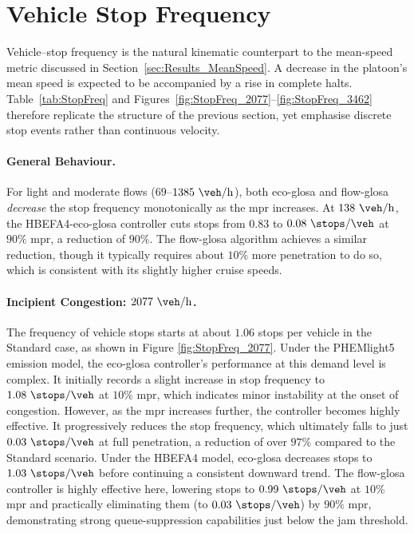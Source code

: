 \section{Vehicle Stop Frequency}
\label{sec:Results_Stops}

Vehicle–stop frequency is the natural kinematic counterpart to the mean-speed metric discussed in Section~\vref{sec:Results_MeanSpeed}. A decrease in the platoon’s mean speed is expected to be accompanied by a rise in complete halts. Table~\vref{tab:StopFreq} and Figures~\vref{fig:StopFreq_2077}–\vref{fig:StopFreq_3462} therefore replicate the structure of the previous section, yet emphasise discrete stop events rather than continuous velocity.

\paragraph{General Behaviour.}

For light and moderate flows ($69$--$1385~\unit{\veh\per\hour}$), both \ac{eco-glosa} and \ac{flow-glosa} \emph{decrease} the stop frequency monotonically as the \ac{mpr} increases. At $138~\unit{\veh\per\hour}$, the HBEFA4-\ac{eco-glosa} controller cuts stops from $0.83$ to $0.08~\unit{\stops\per\veh}$ at $90\%$ \ac{mpr}, a reduction of $90\%$. The \ac{flow-glosa} algorithm achieves a similar reduction, though it typically requires about $10\%$ more penetration to do so, which is consistent with its slightly higher cruise speeds.

\paragraph{Incipient Congestion: $2077~\unit{\veh\per\hour}$.}
The frequency of vehicle stops starts at about $1.06$ stops per vehicle in the Standard case, as shown in Figure \vref{fig:StopFreq_2077}. Under the PHEMlight5 emission model, the \ac{eco-glosa} controller's performance at this demand level is complex. It initially records a slight increase in stop frequency to $1.08~\unit{\stops\per\veh}$ at $10\%$ \ac{mpr}, which indicates minor instability at the onset of congestion. However, as the \ac{mpr} increases further, the controller becomes highly effective. It progressively reduces the stop frequency, which ultimately falls to just $0.03~\unit{\stops\per\veh}$ at full penetration, a reduction of over $97\%$ compared to the Standard scenario. Under the HBEFA4 model, \ac{eco-glosa} decreases stops to $1.03~\unit{\stops\per\veh}$ before continuing a consistent downward trend. The \ac{flow-glosa} controller is highly effective here, lowering stops to $0.99~\unit{\stops\per\veh}$ at $10\%$ \ac{mpr} and practically eliminating them (to $0.03~\unit{\stops\per\veh}$) by $90\%$ \ac{mpr}, demonstrating strong queue-suppression capabilities just below the jam threshold.

